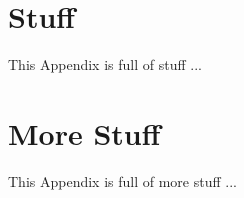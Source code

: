 \chapter{Stuff}

This Appendix is full of stuff ...

\chapter{More Stuff}

This Appendix is full of more stuff ...